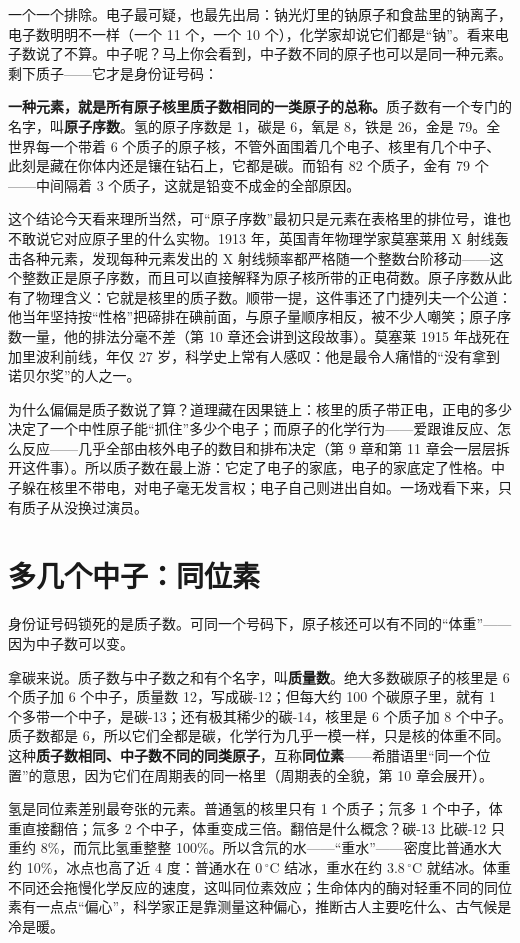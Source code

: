 一个一个排除。电子最可疑，也最先出局：钠光灯里的钠原子和食盐里的钠离子，电子数明明不一样（一个 11 个，一个 10 个），化学家却说它们都是“钠”。看来电子数说了不算。中子呢？马上你会看到，中子数不同的原子也可以是同一种元素。剩下质子——它才是身份证号码：

\textbf{一种元素，就是所有原子核里质子数相同的一类原子的总称。}质子数有一个专门的名字，叫\textbf{原子序数}。氢的原子序数是 1，碳是 6，氧是 8，铁是 26，金是 79。全世界每一个带着 6 个质子的原子核，不管外面围着几个电子、核里有几个中子、此刻是藏在你体内还是镶在钻石上，它都是碳。而铅有 82 个质子，金有 79 个——中间隔着 3 个质子，这就是铅变不成金的全部原因。

这个结论今天看来理所当然，可“原子序数”最初只是元素在表格里的排位号，谁也不敢说它对应原子里的什么实物。1913 年，英国青年物理学家莫塞莱用 X 射线轰击各种元素，发现每种元素发出的 X 射线频率都严格随一个整数台阶移动——这个整数正是原子序数，而且可以直接解释为原子核所带的正电荷数。原子序数从此有了物理含义：它就是核里的质子数。顺带一提，这件事还了门捷列夫一个公道：他当年坚持按“性格”把碲排在碘前面，与原子量顺序相反，被不少人嘲笑；原子序数一量，他的排法分毫不差（第 10 章还会讲到这段故事）。莫塞莱 1915 年战死在加里波利前线，年仅 27 岁，科学史上常有人感叹：他是最令人痛惜的“没有拿到诺贝尔奖”的人之一。

为什么偏偏是质子数说了算？道理藏在因果链上：核里的质子带正电，正电的多少决定了一个中性原子能“抓住”多少个电子；而原子的化学行为——爱跟谁反应、怎么反应——几乎全部由核外电子的数目和排布决定（第 9 章和第 11 章会一层层拆开这件事）。所以质子数在最上游：它定了电子的家底，电子的家底定了性格。中子躲在核里不带电，对电子毫无发言权；电子自己则进出自如。一场戏看下来，只有质子从没换过演员。

\section{多几个中子：同位素}

身份证号码锁死的是质子数。可同一个号码下，原子核还可以有不同的“体重”——因为中子数可以变。

拿碳来说。质子数与中子数之和有个名字，叫\textbf{质量数}。绝大多数碳原子的核里是 6 个质子加 6 个中子，质量数 12，写成碳-12；但每大约 100 个碳原子里，就有 1 个多带一个中子，是碳-13；还有极其稀少的碳-14，核里是 6 个质子加 8 个中子。质子数都是 6，所以它们全都是碳，化学行为几乎一模一样，只是核的体重不同。这种\textbf{质子数相同、中子数不同的同类原子}，互称\textbf{同位素}——希腊语里“同一个位置”的意思，因为它们在周期表的同一格里（周期表的全貌，第 10 章会展开）。

氢是同位素差别最夸张的元素。普通氢的核里只有 1 个质子；氘多 1 个中子，体重直接翻倍；氚多 2 个中子，体重变成三倍。翻倍是什么概念？碳-13 比碳-12 只重约 8\%，而氘比氢重整整 100\%。所以含氘的水——“重水”——密度比普通水大约 10\%，冰点也高了近 4 度：普通水在 $0\,^{\circ}\mathrm{C}$ 结冰，重水在约 $3.8\,^{\circ}\mathrm{C}$ 就结冰。体重不同还会拖慢化学反应的速度，这叫同位素效应；生命体内的酶对轻重不同的同位素有一点点“偏心”，科学家正是靠测量这种偏心，推断古人主要吃什么、古气候是冷是暖。

